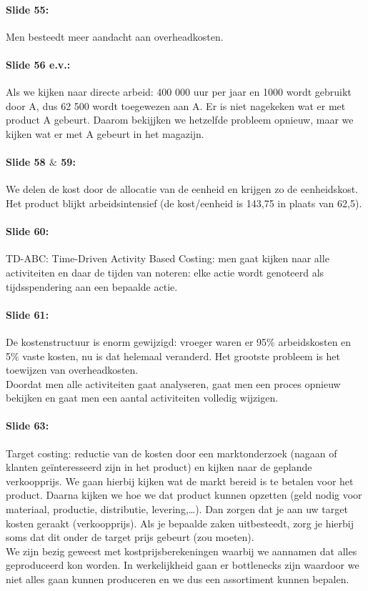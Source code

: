 \documentclass[10pt,a4paper]{report}
\begin{document}
\paragraph{Slide 55:} Men besteedt meer aandacht aan overheadkosten.

\paragraph{Slide 56 e.v.:} Als we kijken naar directe arbeid: 400 000 uur per jaar en 1000 wordt gebruikt door A, dus 62 500 wordt toegewezen aan A. Er is niet nagekeken wat er met product A gebeurt. Daarom bekijjken we hetzelfde probleem opnieuw, maar we kijken wat er met A gebeurt in het magazijn.

\paragraph{Slide 58 $\&$ 59:} We delen de kost door de allocatie van de eenheid en krijgen zo de eenheidskost. Het product blijkt arbeidsintensief (de kost/eenheid is 143,75 in plaats van 62,5).

\paragraph{Slide 60:} TD-ABC: Time-Driven Activity Based Costing: men gaat kijken naar alle activiteiten en daar de tijden van noteren: elke actie wordt genoteerd als tijdsspendering aan een bepaalde actie.

\paragraph{Slide 61:} De kostenstructuur is enorm gewijzigd: vroeger waren er 95\% arbeidskosten en 5\% vaste kosten, nu is dat helemaal veranderd. Het grootste probleem is het toewijzen van overheadkosten.\\
Doordat men alle activiteiten gaat analyseren, gaat men een proces opnieuw bekijken en gaat men een aantal activiteiten volledig wijzigen.

\paragraph{Slide 63:} Target costing: reductie van de kosten door een marktonderzoek (nagaan of klanten ge\"interesseerd zijn in het product) en kijken naar de geplande verkoopprijs. We gaan hierbij kijken wat de markt bereid is te betalen voor het product. Daarna kijken we hoe we dat product kunnen opzetten (geld nodig voor materiaal, productie, distributie, levering,…). Dan zorgen dat je aan uw target kosten geraakt (verkoopprijs). Als je bepaalde zaken uitbesteedt, zorg je hierbij soms dat dit onder de target prijs gebeurt (zou moeten).\\
We zijn bezig geweest met kostprijsberekeningen waarbij we aannamen dat alles geproduceerd kon worden. In werkelijkheid gaan er bottlenecks zijn waardoor we niet alles gaan kunnen produceren en we dus een assortiment kunnen bepalen. 
\end{document}
